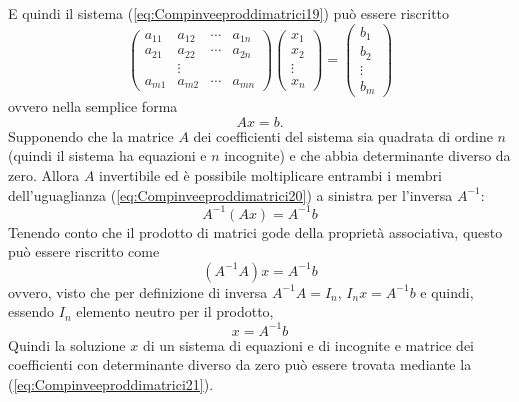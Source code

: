 E quindi il sistema (\ref{eq:Compinveeproddimatrici19}) può essere riscritto
\begin{equation*}
  \begin{pmatrix}
    a_{11} & a_{12} & \cdots & a_{1n}\\
    a_{21} & a_{22} & \cdots & a_{2n}\\
           &\vdots\\
    a_{m1} & a_{m2} & \cdots & a_{mn}
  \end{pmatrix}
  \begin{pmatrix}
    x_1\\
    x_2\\
    \vdots\\
    x_n
  \end{pmatrix}=\begin{pmatrix}
    b_1\\
    b_2\\
    \vdots\\
    b_m
  \end{pmatrix}
\end{equation*}
ovvero nella semplice forma
\begin{equation}
  \label{eq:Compinveeproddimatrici20}
  Ax=b.
\end{equation}
Supponendo che la matrice $A$ dei coefficienti del sistema sia quadrata di ordine $n$ (quindi il
sistema ha equazioni e $n$ incognite) e che abbia determinante diverso da zero. Allora $A$ invertibile
ed è possibile moltiplicare entrambi i membri dell'uguaglianza (\ref{eq:Compinveeproddimatrici20}) a
sinistra per l'inversa $A^{-1}$:
\begin{equation*}
  A^{-1}(Ax)=A^{-1}b
\end{equation*}
Tenendo conto che il prodotto di matrici gode della proprietà associativa, questo può essere riscritto
come
\begin{equation*}
  (A^{-1}A)x=A^{-1}b
\end{equation*}
ovvero, visto che per definizione di inversa $A^{-1}A=I_n$, $I_nx=A^{-1}b$ e quindi, essendo $I_n$
elemento neutro per il prodotto,
\begin{equation}
  \label{eq:Compinveeproddimatrici21}
  x=A^{-1}b
\end{equation}
Quindi la soluzione $x$ di un sistema di equazioni e di incognite e matrice dei coefficienti con
determinante diverso da zero può essere trovata mediante la (\ref{eq:Compinveeproddimatrici21}).
